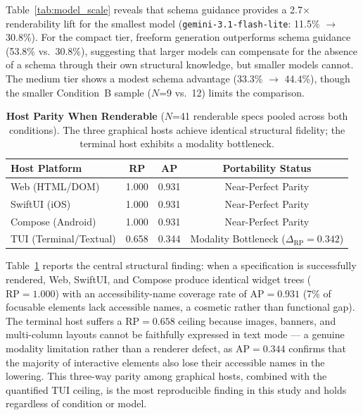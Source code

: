 \documentclass{article}
\begin{document}
Table~\ref{tab:model_scale} reveals that schema guidance provides a 2.7$\times$ renderability lift for the smallest model (\texttt{gemini-3.1-flash-lite}: 11.5\% $\rightarrow$ 30.8\%). For the compact tier, freeform generation outperforms schema guidance (53.8\% vs.\ 30.8\%), suggesting that larger models can compensate for the absence of a schema through their own structural knowledge, but smaller models cannot. The medium tier shows a modest schema advantage (33.3\% $\rightarrow$ 44.4\%), though the smaller Condition~B sample ($N$=9 vs.\ 12) limits the comparison.

\begin{table}[h]
\centering
\caption{\textbf{Host Parity When Renderable} ($N$=41 renderable specs pooled across both conditions). The three graphical hosts achieve identical structural fidelity; the terminal host exhibits a modality bottleneck.}
\label{tab:host_parity}
\begin{tabular}{lccc}
\toprule
\textbf{Host Platform} & \textbf{RP} & \textbf{AP} & \textbf{Portability Status} \\
\midrule
Web (HTML/DOM)         & 1.000 & 0.931 & Near-Perfect Parity \\
SwiftUI (iOS)          & 1.000 & 0.931 & Near-Perfect Parity \\
Compose (Android)      & 1.000 & 0.931 & Near-Perfect Parity \\
TUI (Terminal/Textual) & 0.658 & 0.344 & Modality Bottleneck ($\Delta_{\mathrm{RP}} = 0.342$) \\
\bottomrule
\end{tabular}
\end{table}

Table~\ref{tab:host_parity} reports the central structural finding: when a specification is successfully rendered, Web, SwiftUI, and Compose produce identical widget trees ($\mathrm{RP}=1.000$) with an accessibility-name coverage rate of $\mathrm{AP}=0.931$ (7\% of focusable elements lack accessible names, a cosmetic rather than functional gap). The terminal host suffers a $\mathrm{RP}=0.658$ ceiling because images, banners, and multi-column layouts cannot be faithfully expressed in text mode --- a genuine modality limitation rather than a renderer defect, as $\mathrm{AP}=0.344$ confirms that the majority of interactive elements also lose their accessible names in the lowering. This three-way parity among graphical hosts, combined with the quantified TUI ceiling, is the most reproducible finding in this study and holds regardless of condition or model.
\end{document}
